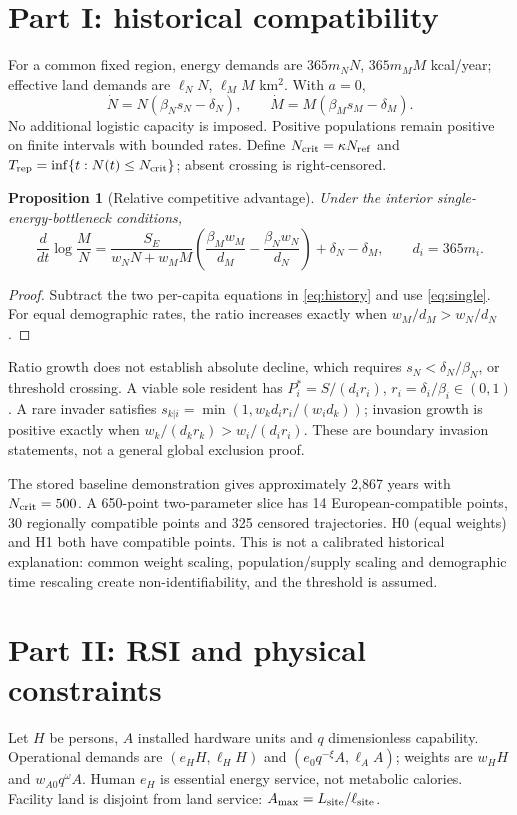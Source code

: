 \documentclass[11pt]{article}
\newtheorem{proposition}{Proposition}
\begin{document}
\section{Part I: historical compatibility}
For a common fixed region, energy demands are $365m_NN$, $365m_MM$ kcal/year;
effective land demands are $\ell_NN$, $\ell_MM$ km$^2$. With $a=0$,
\begin{equation}
\dot N=N(\beta_Ns_N-\delta_N),\qquad
\dot M=M(\beta_Ms_M-\delta_M).\label{eq:history}
\end{equation}
No additional logistic capacity is imposed. Positive populations remain positive
on finite intervals with bounded rates. Define $N_{\rm crit}=\kappa N_{\rm ref}$
and $T_{\rm rep}=\inf\{t:N(t)\le N_{\rm crit}\}$; absent crossing is right-censored.

\begin{proposition}[Relative competitive advantage]
Under the interior single-energy-bottleneck conditions,
\begin{equation}
\frac{d}{dt}\log\frac{M}{N}=\frac{S_E}{w_NN+w_MM}
\left(\frac{\beta_Mw_M}{d_M}-\frac{\beta_Nw_N}{d_N}\right)
+\delta_N-\delta_M,\qquad d_i=365m_i.
\end{equation}
\end{proposition}
\begin{proof}
Subtract the two per-capita equations in \eqref{eq:history} and use
\eqref{eq:single}. For equal demographic rates, the ratio increases exactly
when $w_M/d_M>w_N/d_N$.
\end{proof}
Ratio growth does not establish absolute decline, which requires
$s_N<\delta_N/\beta_N$, or threshold crossing. A viable sole resident has
$P_i^*=S/(d_ir_i)$, $r_i=\delta_i/\beta_i\in(0,1)$. A rare invader satisfies
$s_{k|i}=\min(1,w_kd_ir_i/(w_id_k))$; invasion growth is positive exactly when
$w_k/(d_kr_k)>w_i/(d_ir_i)$. These are boundary invasion statements, not a
general global exclusion proof.

The stored baseline demonstration gives approximately 2,867 years with
$N_{\rm crit}=500$. A 650-point two-parameter slice has 14 European-compatible
points, 30 regionally compatible points and 325 censored trajectories. H0
(equal weights) and H1 both have compatible points. This is not a calibrated
historical explanation: common weight scaling, population/supply scaling and
demographic time rescaling create non-identifiability, and the threshold is assumed.

\section{Part II: RSI and physical constraints}
Let $H$ be persons, $A$ installed hardware units and $q$ dimensionless capability.
Operational demands are $(e_HH,\ell_HH)$ and $(e_0q^{-\xi}A,\ell_AA)$; weights
are $w_HH$ and $w_{A0}q^\omega A$. Human $e_H$ is essential energy service,
not metabolic calories. Facility land is disjoint from land service:
$A_{\max}=L_{\rm site}/\ell_{\rm site}$.
\end{document}
